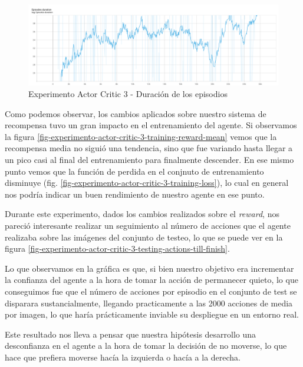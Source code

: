 \begin{figure}[H]
	\centering
	\includegraphics[width=1\textwidth]{figuras/experiments/actor_critic/reward_2_rew_by_two_stop_with_none/episodes_duration.png}
	\caption[Experimento Actor Critic 3 - Duración de los episodios]{Experimento Actor Critic 3 - Duración de los episodios}
	\label{fig-experimento-actor-critic-3-episodes-duration}
\end{figure}

Como podemos observar, los cambios aplicados sobre nuestro sistema de recompensa tuvo un gran impacto en el entrenamiento del agente. Si observamos la figura \ref{fig-experimento-actor-critic-3-training-reward-mean} vemos que la recompensa media no siguió una tendencia, sino que fue variando hasta llegar a un pico casi al final del entrenamiento para finalmente descender. En ese mismo punto vemos que la función de perdida en el conjnuto de entrenamiento disminuye (fig. \ref{fig-experimento-actor-critic-3-training-loss}), lo cual en general nos podría indicar un buen rendimiento de nuestro agente en ese punto.
\medskip

Durante este experimento, dados los cambios realizados sobre el \textit{reward}, nos pareció interesante realizar un seguimiento al número de acciones que el agente realizaba sobre las imágenes del conjunto de testeo, lo que se puede ver en la figura \ref{fig-experimento-actor-critic-3-testing-actions-till-finish}.
\medskip

Lo que observamos en la gráfica es que, si bien nuestro objetivo era incrementar la confianza del agente a la hora de tomar la acción de permanecer quieto, lo que conseguimos fue que el número de acciones por episodio en el conjunto de test se disparara sustancialmente, llegando practicamente a las 2000 acciones de media por imagen, lo que haría prácticamente inviable su despliegue en un entorno real.
\medskip

Este resultado nos lleva a pensar que nuestra hipótesis desarrollo una desconfianza en el agente a la hora de tomar la decisión de no moverse, lo que hace que prefiera moverse hacía la izquierda o hacía a la derecha.
\medskip

